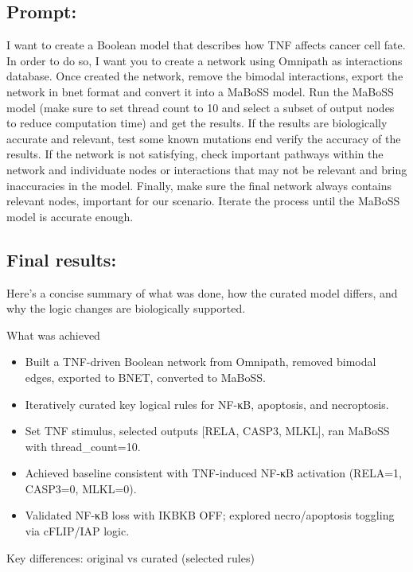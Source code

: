 \hypertarget{prompt-2}{%
\subsection{Prompt:}\label{prompt-2}}

I want to create a Boolean model that describes how TNF affects cancer
cell fate. In order to do so, I want you to create a network using
Omnipath as interactions database. Once created the network, remove the
bimodal interactions, export the network in bnet format and convert it
into a MaBoSS model. Run the MaBoSS model (make sure to set thread count
to 10 and select a subset of output nodes to reduce computation time)
and get the results. If the results are biologically accurate and
relevant, test some known mutations end verify the accuracy of the
results. If the network is not satisfying, check important pathways
within the network and individuate nodes or interactions that may not be
relevant and bring inaccuracies in the model. Finally, make sure the
final network always contains relevant nodes, important for our
scenario. Iterate the process until the MaBoSS model is accurate enough.

\hypertarget{final-results-2}{%
\subsection{Final results:}\label{final-results-2}}

Here's a concise summary of what was done, how the curated model
differs, and why the logic changes are biologically supported.

What was achieved

\begin{itemize}
\tightlist
\item
  Built a TNF-driven Boolean network from Omnipath, removed bimodal
  edges, exported to BNET, converted to MaBoSS.
\item
  Iteratively curated key logical rules for NF-κB, apoptosis, and
  necroptosis.
\item
  Set TNF stimulus, selected outputs {[}RELA, CASP3, MLKL{]}, ran MaBoSS
  with thread\_count=10.
\item
  Achieved baseline consistent with TNF-induced NF-κB activation
  (RELA=1, CASP3=0, MLKL=0).
\item
  Validated NF-κB loss with IKBKB OFF; explored necro/apoptosis toggling
  via cFLIP/IAP logic.
\end{itemize}

Key differences: original vs curated (selected rules)

